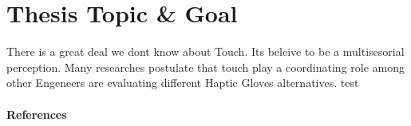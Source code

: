 \documentclass[12pt,oneside,openright]{report}
\begin{document}
\section*{Thesis Topic \& Goal}

There is a great deal we dont know about Touch. Its beleive to be a multisesorial perception. Many researches postulate that touch play a coordinating role among other 
Engeneers are evaluating different Haptic Gloves alternatives.
test\cite{hendrickson2016serverless}

\paragraph{\textbf{References}}
\printbibliography[heading=none]
\end{document}
